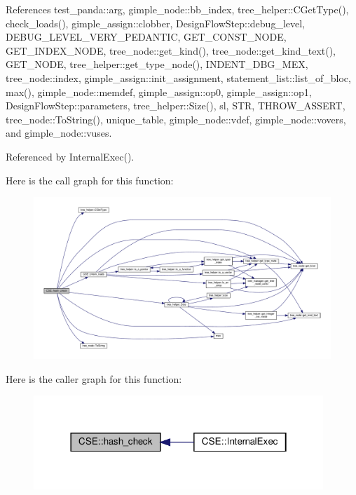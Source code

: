References test\+\_\+panda\+::arg, gimple\+\_\+node\+::bb\+\_\+index, tree\+\_\+helper\+::\+C\+Get\+Type(), check\+\_\+loads(), gimple\+\_\+assign\+::clobber, Design\+Flow\+Step\+::debug\+\_\+level, D\+E\+B\+U\+G\+\_\+\+L\+E\+V\+E\+L\+\_\+\+V\+E\+R\+Y\+\_\+\+P\+E\+D\+A\+N\+T\+IC, G\+E\+T\+\_\+\+C\+O\+N\+S\+T\+\_\+\+N\+O\+DE, G\+E\+T\+\_\+\+I\+N\+D\+E\+X\+\_\+\+N\+O\+DE, tree\+\_\+node\+::get\+\_\+kind(), tree\+\_\+node\+::get\+\_\+kind\+\_\+text(), G\+E\+T\+\_\+\+N\+O\+DE, tree\+\_\+helper\+::get\+\_\+type\+\_\+node(), I\+N\+D\+E\+N\+T\+\_\+\+D\+B\+G\+\_\+\+M\+EX, tree\+\_\+node\+::index, gimple\+\_\+assign\+::init\+\_\+assignment, statement\+\_\+list\+::list\+\_\+of\+\_\+bloc, max(), gimple\+\_\+node\+::memdef, gimple\+\_\+assign\+::op0, gimple\+\_\+assign\+::op1, Design\+Flow\+Step\+::parameters, tree\+\_\+helper\+::\+Size(), sl, S\+TR, T\+H\+R\+O\+W\+\_\+\+A\+S\+S\+E\+RT, tree\+\_\+node\+::\+To\+String(), unique\+\_\+table, gimple\+\_\+node\+::vdef, gimple\+\_\+node\+::vovers, and gimple\+\_\+node\+::vuses.



Referenced by Internal\+Exec().

Here is the call graph for this function\+:
\nopagebreak
\begin{figure}[H]
\begin{center}
\leavevmode
\includegraphics[width=350pt]{d1/d73/classCSE_a0b52dafe140cbca69eadfa11169bfbba_cgraph}
\end{center}
\end{figure}
Here is the caller graph for this function\+:
\nopagebreak
\begin{figure}[H]
\begin{center}
\leavevmode
\includegraphics[width=310pt]{d1/d73/classCSE_a0b52dafe140cbca69eadfa11169bfbba_icgraph}
\end{center}
\end{figure}
\mbox{\label{classCSE_a6bb59a891291b3ecfec7072ce1b2d77d}} 
